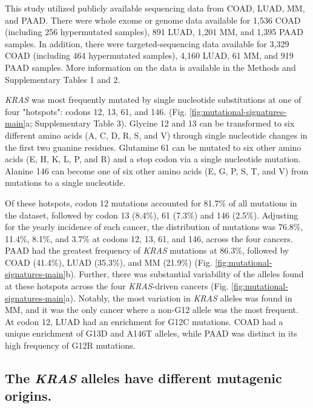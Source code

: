 \documentclass[english, 10pt, letterpaper]{article}
\newcommand{\KRAS}{\emph{KRAS}}
\begin{document}
This study utilized publicly available sequencing data from COAD, LUAD, MM, and PAAD.
There were whole exome or genome data available for 1,536 COAD (including 256 hypermutated samples), 891 LUAD, 1,201 MM, and 1,395 PAAD samples.
In addition, there were targeted-sequencing data available for 3,329 COAD (including 464 hypermutated samples), 4,160 LUAD, 61 MM, and 919 PAAD samples.
More information on the data is available in the Methods and Supplementary Tables 1 and 2.

\KRAS{} was most frequently mutated by single nucleotide substitutions at one of four "hotspots": codons 12, 13, 61, and 146. (Fig. \ref{fig:mutational-signatures-main}a; Supplementary Table 3).
Glycine 12 and 13 can be transformed to six different amino acids (A, C, D, R, S, and V) through single nucleotide changes in the first two guanine residues.
Glutamine 61 can be mutated to six other amino acids (E, H, K, L, P, and R) and a stop codon via a single nucleotide mutation.
Alanine 146 can become one of six other amino acids (E, G, P, S, T, and V) from mutations to a single nucleotide.

Of these hotspots, codon 12 mutations accounted for 81.7\% of all mutations in the dataset, followed by codon 13 (8.4\%), 61 (7.3\%) and 146 (2.5\%).
Adjusting for the yearly incidence of each cancer, the distribution of mutations was 76.8\%, 11.4\%, 8.1\%, and 3.7\% at codons 12, 13, 61, and 146, across the four cancers.
PAAD had the greatest frequency of \KRAS{} mutations at 86.3\%, followed by COAD (41.4\%), LUAD (35.3\%), and MM (21.9\%) (Fig. \ref{fig:mutational-signatures-main}b).
Further, there was substantial variability of the alleles found at these hotspots across the four \KRAS{}-driven cancers (Fig. \ref{fig:mutational-signatures-main}a). 
Notably, the most variation in \KRAS{} alleles was found in MM, and it was the only cancer where a non-G12 allele was the most frequent.
At codon 12, LUAD had an enrichment for G12C mutations.
COAD had a unique enrichment of G13D and A146T alleles, while PAAD was distinct in its high frequency of G12R mutations.


\subsection*{The \KRAS{} alleles have different mutagenic origins.}
\end{document}
